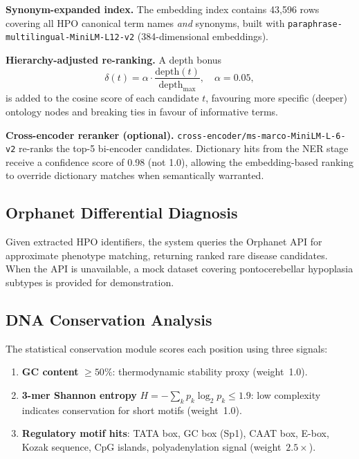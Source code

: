\documentclass[11pt,a4paper]{article}
\begin{document}
\textbf{Synonym-expanded index.}  The embedding index contains 43{,}596 rows
covering all HPO canonical term names \emph{and} synonyms, built with
\texttt{paraphrase-multilingual-MiniLM-L12-v2} (384-dimensional embeddings).

\textbf{Hierarchy-adjusted re-ranking.}  A depth bonus
\begin{equation}
  \delta(t) = \alpha \cdot \frac{\mathrm{depth}(t)}{\mathrm{depth}_{\max}},
  \quad \alpha = 0.05,
  \label{eq:depth}
\end{equation}
is added to the cosine score of each candidate $t$, favouring more specific
(deeper) ontology nodes and breaking ties in favour of informative terms.

\textbf{Cross-encoder reranker (optional).}
\texttt{cross-encoder/ms-marco-MiniLM-L-6-v2} re-ranks the top-5 bi-encoder
candidates.  Dictionary hits from the NER stage receive a confidence score of
0.98 (not 1.0), allowing the embedding-based ranking to override dictionary
matches when semantically warranted.

\subsection{Orphanet Differential Diagnosis}

Given extracted HPO identifiers, the system queries the Orphanet API for
approximate phenotype matching, returning ranked rare disease candidates.  When
the API is unavailable, a mock dataset covering pontocerebellar hypoplasia
subtypes is provided for demonstration.

\subsection{DNA Conservation Analysis}

The statistical conservation module scores each position using three signals:

\begin{enumerate}[nosep]
  \item \textbf{GC content} $\geq 50\%$: thermodynamic stability proxy
        (weight~1.0).
  \item \textbf{3-mer Shannon entropy}
        $H = -\sum_{k} p_k \log_2 p_k \leq 1.9$:
        low complexity indicates conservation for short motifs (weight~1.0).
  \item \textbf{Regulatory motif hits}: TATA box, GC box (Sp1), CAAT box,
        E-box, Kozak sequence, CpG islands, polyadenylation signal
        (weight~$2.5\times$).
\end{enumerate}
\end{document}
